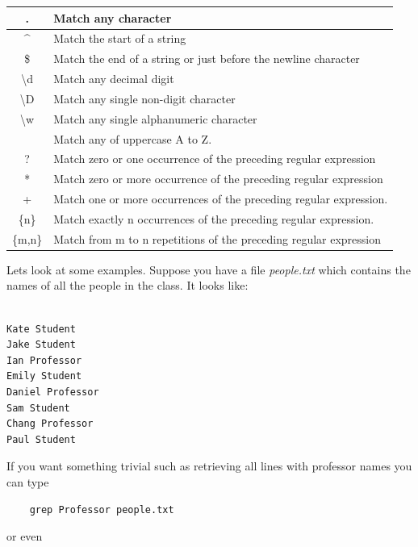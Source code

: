 \begin{center}
    \begin{tabular}{c|l}
        \hline
        . & Match any character \\ \hline
        \^{} & Match the start of a string \\ \hline
        \$ & Match the end of a string or just before the newline character \\ \hline
            \textbackslash d & Match any decimal digit \\ \hline
            \textbackslash D &  Match any single non-digit character \\ \hline
            \textbackslash w & Match any single alphanumeric character  \\ \hline   
            [A-Z] & Match any of uppercase A to Z. \\ \hline
           ? &	Match zero or one occurrence of the preceding regular expression \\ \hline
            * &	Match zero or more occurrence of the preceding regular expression \\ \hline
            + &	Match one or more occurrences of the preceding regular expression. \\ \hline
            \{n\} &	Match exactly n occurrences of the preceding regular expression.\\ \hline
            \{m,n\} &	Match from m to n repetitions of the preceding regular expression \\ \hline 
            
        
    \end{tabular}
\end{center}

Lets look at some examples. Suppose you have a file \textit{people.txt} which contains the names of all the people in the class. It looks like:

\begin{verbatim}

Kate Student
Jake Student
Ian Professor
Emily Student
Daniel Professor
Sam Student
Chang Professor
Paul Student
\end{verbatim}

If you want something trivial such as retrieving all lines with professor names you can type

\begin{verbatim}
    grep Professor people.txt
\end{verbatim}

or even 

